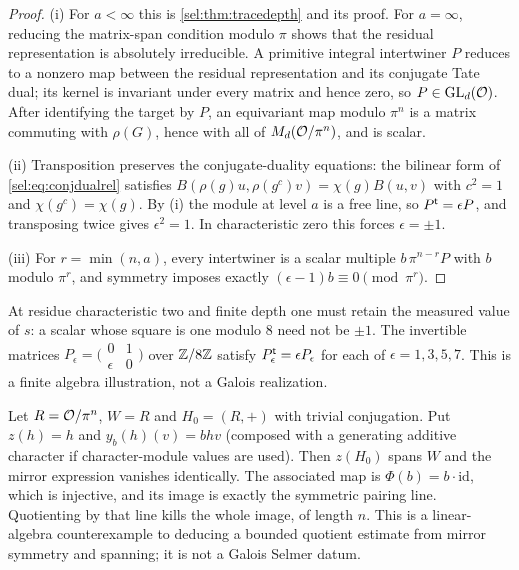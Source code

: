 \begin{proof}
(i) For $a<\infty$ this is \cref{sel:thm:tracedepth} and its proof. For
$a=\infty$, reducing the matrix-span condition modulo $\pi$ shows that the
residual representation is absolutely irreducible. A primitive integral
intertwiner $P$ reduces to a nonzero map between the residual representation
and its conjugate Tate dual; its kernel is invariant under every matrix and
hence zero, so $P\in\operatorname{GL}_d(\mathcal{O})$. After identifying the target by $P$, an
equivariant map modulo $\pi^n$ is a matrix commuting with $\rho(G)$, hence
with all of $M_d(\mathcal{O}/\pi^n)$, and is scalar.

(ii) Transposition preserves the conjugate-duality equations: the bilinear
form of \eqref{sel:eq:conjdualrel} satisfies
$B(\rho(g)u,\rho(g^c)v)=\chi(g)B(u,v)$ with $c^2=1$ and
$\chi(g^c)=\chi(g)$. By (i) the module at level $a$ is a free line, so
$P^{\mathsf{t}}=\epsilon P$, and transposing twice gives $\epsilon^2=1$. In
characteristic zero this forces $\epsilon=\pm1$.

(iii) For $r=\min(n,a)$, every intertwiner is a scalar multiple
$b\,\pi^{n-r}P$ with $b$ modulo $\pi^r$, and symmetry imposes exactly
$(\epsilon-1)b\equiv0\pmod{\pi^r}$.
\end{proof}

At residue characteristic two and finite depth one must retain the measured
value of $s$: a scalar whose square is one modulo $8$ need not be $\pm1$.
The invertible matrices
$P_\epsilon=\bigl(\begin{smallmatrix}0&1\\\epsilon&0\end{smallmatrix}\bigr)$
over $\mathbb{Z}/8\mathbb{Z}$ satisfy $P_\epsilon^{\mathsf{t}}=\epsilon P_\epsilon$ for each of
$\epsilon=1,3,5,7$. This is a finite algebra illustration, not a Galois
realization.


\begin{remark}\label{sel:rem:quotient}
Let $R=\mathcal{O}/\pi^n$, $W=R$ and $H_0=(R,+)$ with trivial conjugation. Put
$z(h)=h$ and $y_b(h)(v)=bhv$ (composed with a generating additive character
if character-module values are used). Then $z(H_0)$ spans $W$ and the mirror
expression vanishes identically. The associated map is
$\Phi(b)=b\cdot\mathrm{id}$, which is injective, and its image is exactly
the symmetric pairing line. Quotienting by that line kills the whole image,
of length $n$. This is a linear-algebra counterexample to deducing a bounded
quotient estimate from mirror symmetry and spanning; it is not a Galois
Selmer datum.
\end{remark}

